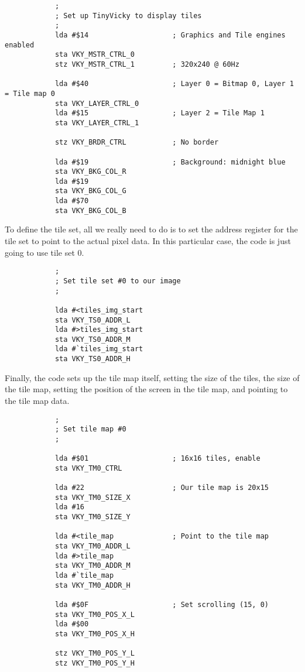 \begin{verbatim}
            ;
            ; Set up TinyVicky to display tiles
            ;
            lda #$14                    ; Graphics and Tile engines enabled
            sta VKY_MSTR_CTRL_0
            stz VKY_MSTR_CTRL_1         ; 320x240 @ 60Hz

            lda #$40                    ; Layer 0 = Bitmap 0, Layer 1 = Tile map 0
            sta VKY_LAYER_CTRL_0
            lda #$15                    ; Layer 2 = Tile Map 1
            sta VKY_LAYER_CTRL_1

            stz VKY_BRDR_CTRL           ; No border

            lda #$19                    ; Background: midnight blue
            sta VKY_BKG_COL_R
            lda #$19
            sta VKY_BKG_COL_G
            lda #$70
            sta VKY_BKG_COL_B
\end{verbatim}

To define the tile set, all we really need to do is to set the address register for the tile set to point to the actual pixel data. In this particular case, the code is just going to use tile set 0.

\begin{verbatim}
            ;
            ; Set tile set #0 to our image
            ;

            lda #<tiles_img_start
            sta VKY_TS0_ADDR_L
            lda #>tiles_img_start
            sta VKY_TS0_ADDR_M
            lda #`tiles_img_start
            sta VKY_TS0_ADDR_H
\end{verbatim}

Finally, the code sets up the tile map itself, setting the size of the tiles, the size of the tile map, setting the position of the screen in the tile map, and pointing to the tile map data.

\begin{verbatim}
            ;
            ; Set tile map #0
            ;

            lda #$01                    ; 16x16 tiles, enable
            sta VKY_TM0_CTRL

            lda #22                     ; Our tile map is 20x15
            sta VKY_TM0_SIZE_X
            lda #16
            sta VKY_TM0_SIZE_Y

            lda #<tile_map              ; Point to the tile map
            sta VKY_TM0_ADDR_L
            lda #>tile_map
            sta VKY_TM0_ADDR_M
            lda #`tile_map
            sta VKY_TM0_ADDR_H

            lda #$0F                    ; Set scrolling (15, 0)
            sta VKY_TM0_POS_X_L
            lda #$00
            sta VKY_TM0_POS_X_H

            stz VKY_TM0_POS_Y_L
            stz VKY_TM0_POS_Y_H
\end{verbatim}

